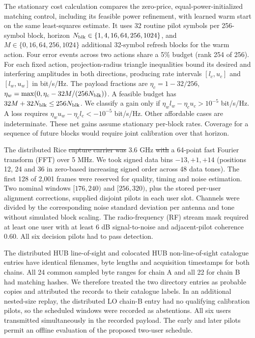 \documentclass[lineno,pdflatex,sn-nature]{sn-jnl}
\makeatletter
\providecommand{\DIFadd}[1]{{\protect\color{blue}\uwave{#1}}} %
\providecommand{\DIFdel}[1]{{\protect\color{red}\sout{#1}}} %
\providecommand{\DIFaddbegin}{} %
\providecommand{\DIFaddend}{} %
\providecommand{\DIFdelbegin}{} %
\providecommand{\DIFdelend}{} %
\providecommand{\DIFscaledelfig}{0.5}
\newlength{\DIFdelgraphicswidth} %
\newlength{\DIFdelgraphicsheight} %
\providecommand{\DIFaddincludegraphics}[2][]{{\color{blue}\fbox{\DIFOincludegraphics[#1]{#2}}}} %
\providecommand{\DIFdelincludegraphics}[2][]{%
\sbox{\DIFdelgraphicsbox}{\DIFOincludegraphics[#1]{#2}}%
\settoboxwidth{\DIFdelgraphicswidth}{\DIFdelgraphicsbox} %
\settoboxtotalheight{\DIFdelgraphicsheight}{\DIFdelgraphicsbox} %
\scalebox{\DIFscaledelfig}{%
\parbox[b]{\DIFdelgraphicswidth}{\usebox{\DIFdelgraphicsbox}\\[-\baselineskip] \rule{\DIFdelgraphicswidth}{0em}}\llap{\resizebox{\DIFdelgraphicswidth}{\DIFdelgraphicsheight}{%
\setlength{\unitlength}{\DIFdelgraphicswidth}%
\begin{picture}(1,1)%
\thicklines\linethickness{2pt} %
{\color[rgb]{1,0,0}\put(0,0){\framebox(1,1){}}}%
{\color[rgb]{1,0,0}\put(0,0){\line( 1,1){1}}}%
{\color[rgb]{1,0,0}\put(0,1){\line(1,-1){1}}}%
\end{picture}%
}\hspace*{3pt}}} %
} %
\DeclareRobustCommand{\DIFaddbegin}{\DIFOaddbegin \let\includegraphics\DIFaddincludegraphics} %
\DeclareRobustCommand{\DIFaddend}{\DIFOaddend \let\includegraphics\DIFOincludegraphics} %
\DeclareRobustCommand{\DIFdelbegin}{\DIFOdelbegin \let\includegraphics\DIFdelincludegraphics} %
\DeclareRobustCommand{\DIFdelend}{\DIFOaddend \let\includegraphics\DIFOincludegraphics} %
\let\sout@orig\sout %
\renewcommand{\sout}[1]{\ifmmode\text{\sout@orig{\ensuremath{#1}}}\else\sout@orig{#1}\fi} %
\makeatother
\begin{document}
The stationary cost calculation compares the zero-price, equal-power-initialized matching control, including its feasible power refinement, with learned warm start on the same least-squares estimate. It uses 32 routine pilot symbols per 256-symbol block, horizon \(N_{\rm blk}\in\{1,4,16,64,256,1024\}\), and \(M\in\{0,16,64,256,1024\}\) additional 32-symbol refresh blocks for the warm action. Four error events across two actions share a 5\% budget (rank 254 of 256). For each fixed action, projection-radius triangle inequalities bound its desired and interfering amplitudes in both directions, producing rate intervals \([l_c,u_c]\) and \([l_w,u_w]\) in bit/s/Hz. The payload fractions are \(\eta_c=1-32/256\), \(\eta_w=\max(0,\eta_c-32M/(256N_{\rm blk}))\). A feasible budget has \(32M+32N_{\rm blk}\leq256N_{\rm blk}\). We classify a gain only if \(\eta_w l_w-\eta_c u_c>10^{-5}\) bit/s/Hz. A loss requires \(\eta_wu_w-\eta_cl_c<-10^{-5}\) bit/s/Hz. Other affordable cases are indeterminate. These net gains assume stationary per-block rates. Coverage for a sequence of future blocks would require joint calibration over that horizon.

The distributed Rice \DIFdelbegin \DIFdel{capture carrier was }\DIFdelend \DIFaddbegin \DIFadd{recordings used a }\DIFaddend 3.6 GHz \DIFdelbegin \DIFdel{with }\DIFdelend \DIFaddbegin \DIFadd{carrier and }\DIFaddend a 64-point fast Fourier transform (FFT) over 5 MHz. We took signed data bins \(-13,+1,+14\) (positions 12, 24 and 36 in zero-based increasing signed order across 48 data tones). The first 128 of 2,001 frames were reserved for quality, timing and noise estimation. Two nominal windows \([176,240)\) and \([256,320)\), plus the stored per-user alignment corrections, supplied disjoint pilots in each user slot. Channels were divided by the corresponding noise standard deviation per antenna and tone without simulated block scaling. The radio-frequency (RF) stream mask required at least one user with at least 6 dB signal-to-noise and adjacent-pilot coherence 0.60. All six decision pilots had to pass detection.

\DIFaddbegin 

\DIFaddend The distributed HUB line-of-sight and colocated HUB non-line-of-sight catalogue entries have identical filenames, byte lengths and acquisition timestamps for both chains. All 24 common sampled byte ranges for chain A and all 22 for chain B had matching hashes. We therefore treated the two directory entries as probable copies and attributed the records to their catalogue labels. In an additional nested-size replay, the distributed LO chain-B entry had no qualifying calibration pilots, so the scheduled windows were recorded as abstentions. All six users transmitted simultaneously in the recorded payload. The early and later pilots permit an offline evaluation of the proposed two-user schedule.
\end{document}
